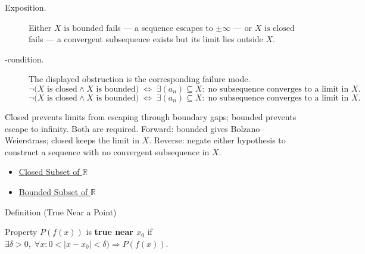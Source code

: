\begin{remark*}
\begin{description}
  \item[Exposition.]
Either $X\text{ is bounded}$ fails --- a sequence escapes to
$\pm\infty$ --- or $X\text{ is closed}$ fails --- a convergent
subsequence exists but its limit lies outside $X$.


  \item[\exists-condition.]
  The displayed obstruction is the corresponding failure mode.
  \[
  \neg\bigl(X\text{ is closed}\wedge X\text{ is bounded}\bigr)
  \;\iff\;
  \exists (a_n)\subseteq X:\;
  \text{no subsequence converges to a limit in } X.
\]
  \[
  \neg\bigl(X\text{ is closed}\wedge X\text{ is bounded}\bigr)
  \;\iff\;
  \exists (a_n)\subseteq X:\;
  \text{no subsequence converges to a limit in } X.
\]
\end{description}
\end{remark*}

\begin{remark*}[Interpretation]
Closed prevents limits from escaping through boundary gaps; bounded
prevents escape to infinity. Both are required. Forward: bounded
gives Bolzano--Weierstrass; closed keeps the limit in $X$. Reverse:
negate either hypothesis to construct a sequence with no convergent
subsequence in $X$.
\end{remark*}

\begin{dependencies}
\begin{itemize}
  \item \hyperref[def:closed-set-r]{Closed Subset of $\mathbb{R}$}
  \item \hyperref[def:bounded-set-r]{Bounded Subset of $\mathbb{R}$}
\end{itemize}
\end{dependencies}


\begin{definitionbox}{Definition (True Near a Point)}
\begin{definition}
\label{def:true-near}
Property $P(f(x))$ is \textbf{true near $x_0$} if
$\exists\delta>0,\;\forall x : 0<|x-x_0|<
\delta) \Rightarrow P(f(x))$.
\end{definition}
\end{definitionbox}

